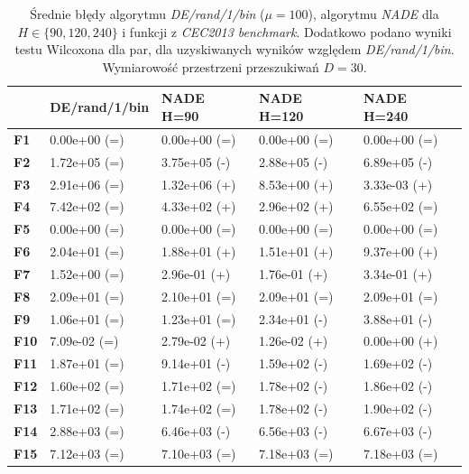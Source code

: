 \documentclass[12pt,a4paper]{report}
\begin{document}
{{{{{{{\begin{table}[h]
\centering
\caption{Średnie błędy algorytmu \emph{DE/rand/1/bin} ($\mu = 100$), algorytmu \emph{NADE} dla $H \in \{90, 120, 240\}$ i funkcji z \emph{CEC2013 benchmark}. Dodatkowo podano wyniki testu Wilcoxona dla par, dla uzyskiwanych wyników względem \emph{DE/rand/1/bin}. Wymiarowość przestrzeni przeszukiwań $D = 30$.}
\label{Eksp130}
\begin{tabular}{|l|l|l|l|l|}
\hline
          & {\bf DE/rand/1/bin} & {\bf NADE H=90} & {\bf NADE H=120} & {\bf NADE H=240} \\ \hline
{\bf F1}  & 0.00e+00 (=)        & 0.00e+00 (=)    & 0.00e+00 (=)     & 0.00e+00 (=)     \\ \hline
{\bf F2}  & 1.72e+05 (=)        & 3.75e+05 (-)    & 2.88e+05 (-)     & 6.89e+05 (-)     \\ \hline
{\bf F3}  & 2.91e+06 (=)        & 1.32e+06 (+)    & 8.53e+00 (+)     & 3.33e-03 (+)     \\ \hline
{\bf F4}  & 7.42e+02 (=)        & 4.33e+02 (+)    & 2.96e+02 (+)     & 6.55e+02 (=)     \\ \hline
{\bf F5}  & 0.00e+00 (=)        & 0.00e+00 (=)    & 0.00e+00 (=)     & 0.00e+00 (=)     \\ \hline
{\bf F6}  & 2.04e+01 (=)        & 1.88e+01 (+)    & 1.51e+01 (+)     & 9.37e+00 (+)     \\ \hline
{\bf F7}  & 1.52e+00 (=)        & 2.96e-01 (+)    & 1.76e-01 (+)     & 3.34e-01 (+)     \\ \hline
{\bf F8}  & 2.09e+01 (=)        & 2.10e+01 (=)    & 2.09e+01 (=)     & 2.09e+01 (=)     \\ \hline
{\bf F9}  & 1.06e+01 (=)        & 1.23e+01 (=)    & 2.34e+01 (-)     & 3.88e+01 (-)     \\ \hline
{\bf F10} & 7.09e-02 (=)        & 2.79e-02 (+)    & 1.26e-02 (+)     & 0.00e+00 (+)     \\ \hline
{\bf F11} & 1.87e+01 (=)        & 9.14e+01 (-)    & 1.59e+02 (-)     & 1.69e+02 (-)     \\ \hline
{\bf F12} & 1.60e+02 (=)        & 1.71e+02 (=)    & 1.78e+02 (-)     & 1.86e+02 (-)     \\ \hline
{\bf F13} & 1.71e+02 (=)        & 1.74e+02 (=)    & 1.78e+02 (-)     & 1.90e+02 (-)     \\ \hline
{\bf F14} & 2.88e+03 (=)        & 6.46e+03 (-)    & 6.56e+03 (-)     & 6.67e+03 (-)     \\ \hline
{\bf F15} & 7.12e+03 (=)        & 7.10e+03 (=)    & 7.18e+03 (=)     & 7.18e+03 (=)     \\ \hline

\end{tabular}
\end{table}}}}}}}}
\end{document}
